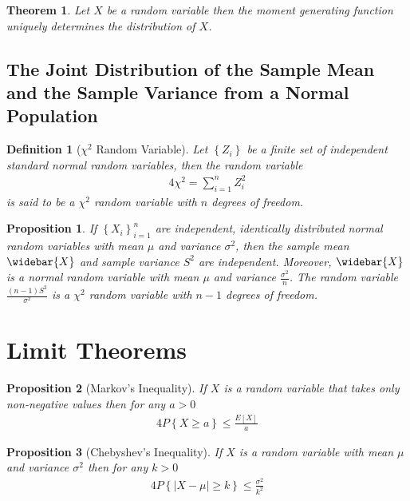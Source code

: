 \documentclass[11pt, oneside]{book}   	%
\newtheorem{definition}{Definition}[chapter]
\newtheorem{proposition}{Proposition}[chapter]
\newtheorem{theorem}{Theorem}[chapter]
\newcommand{\set}[1]{\left\{#1\right\}}
\begin{document}
\begin{theorem}
	Let $X$ be a random variable then the moment generating function uniquely determines the distribution of $X$. 
\end{theorem}

\subsection{The Joint Distribution of the Sample Mean and the Sample Variance from a Normal Population}

\begin{definition}[$\chi^2$ Random Variable]
	Let $\set{Z_i}$ be a finite set of independent standard normal random variables, then the random variable 
 	\begin{alignat}{4}
 		\chi^2=\sum_{i=1}^n Z_i^2
	\end{alignat}
	is said to be a $\chi^2$ random variable with $n$ degrees of freedom. 
\end{definition}

\begin{proposition}
	If $\set{X_i}_{i=1}^n$ are independent, identically distributed normal random variables with mean $\mu$ and variance $\sigma^2$, then the sample mean $\widebar{X}$ and sample variance $S^2$ are independent. Moreover, $\widebar{X}$ is a normal random variable with mean $\mu$ and variance $\frac{\sigma^2}{n}$. The random variable $\frac{(n-1)S^2}{\sigma^2}$ is a $\chi^2$ random variable with $n-1$ degrees of freedom. 
\end{proposition}

\section{Limit Theorems}

\begin{proposition}[Markov's Inequality]
	If $X$ is a random variable that takes only non-negative values then for any $a>0$ 
	\begin{alignat}{4}
		P\set{X\geq a}\leq \frac{E[X]}{a}
	\end{alignat}
\end{proposition}

\begin{proposition}[Chebyshev's Inequality]
	If $X$ is a random variable with mean $\mu$ and variance $\sigma^2$ then for any $k>0$
	\begin{alignat}{4}
		P\set{|X-\mu|\geq k}\leq \frac{\sigma^2}{k^2}
	\end{alignat}
\end{proposition}
\end{document}
